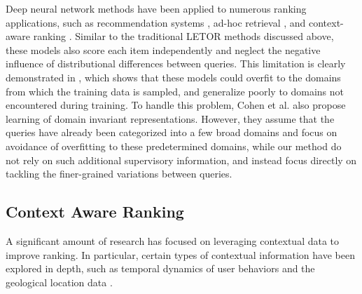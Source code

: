 \documentclass[letterpaper]{article}
\begin{document}
Deep neural network methods have been applied to numerous ranking applications, such as recommendation systems \cite{covington2016deep}, ad-hoc retrieval \cite{fan2018modeling,zamani2018neural}, and context-aware ranking \cite{zamani2017situational}. Similar to the traditional LETOR methods discussed above, these models also score each item independently and neglect the negative influence of distributional differences between queries. This limitation is clearly demonstrated in \cite{cohen2018cross}, which shows that these models could overfit to the domains from which the training data is sampled, and generalize poorly to domains not encountered during training. To handle this problem, Cohen et al. also propose learning of domain invariant representations. However, they assume that the queries have already been categorized into a few broad domains and focus on avoidance of overfitting to these predetermined domains, while our method do not rely on such additional supervisory information, and instead focus directly on tackling the finer-grained variations between queries.

\subsection{Context Aware Ranking}

A significant amount of research has focused on leveraging contextual data to improve ranking. In
particular, certain types of contextual information have been explored in depth, such as temporal dynamics of user behaviors \cite{xiang2010context,chen2018sequential,ATRANK} and the geological location data \cite{zamani2017situational,manotumruksa2018contextual}.
\end{document}
